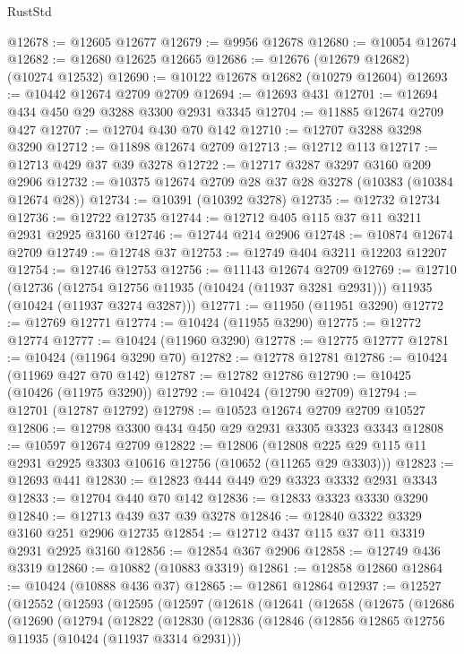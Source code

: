 \begin{lexlean}{RustStd}
\begin{coremodule}
@12678 := @12605 @12677
@12679 := @9956 @12678
@12680 := @10054 @12674
@12682 := @12680 @12625 @12665
@12686 := @12676 (@12679 @12682) (@10274 @12532)
@12690 := @10122 @12678 @12682 (@10279 @12604)
@12693 := @10442 @12674 @2709 @2709
@12694 := @12693 @431
@12701 := @12694 @434 @450 @29 @3288 @3300 @2931 @3345
@12704 := @11885 @12674 @2709 @427
@12707 := @12704 @430 @70 @142
@12710 := @12707 @3288 @3298 @3290
@12712 := @11898 @12674 @2709
@12713 := @12712 @113
@12717 := @12713 @429 @37 @39 @3278
@12722 := @12717 @3287 @3297 @3160 @209 @2906
@12732 := @10375 @12674 @2709 @28 @37 @28 @3278 (@10383 (@10384 @12674 @28))
@12734 := @10391 (@10392 @3278)
@12735 := @12732 @12734
@12736 := @12722 @12735
@12744 := @12712 @405 @115 @37 @11 @3211 @2931 @2925 @3160
@12746 := @12744 @214 @2906
@12748 := @10874 @12674 @2709
@12749 := @12748 @37
@12753 := @12749 @404 @3211 @12203 @12207
@12754 := @12746 @12753
@12756 := @11143 @12674 @2709
@12769 := @12710
    (@12736
      (@12754 @12756 @11935 (@10424 (@11937 @3281 @2931)))
      @11935
      (@10424 (@11937 @3274 @3287)))
@12771 := @11950 (@11951 @3290)
@12772 := @12769 @12771
@12774 := @10424 (@11955 @3290)
@12775 := @12772 @12774
@12777 := @10424 (@11960 @3290)
@12778 := @12775 @12777
@12781 := @10424 (@11964 @3290 @70)
@12782 := @12778 @12781
@12786 := @10424 (@11969 @427 @70 @142)
@12787 := @12782 @12786
@12790 := @10425 (@10426 (@11975 @3290))
@12792 := @10424 (@12790 @2709)
@12794 := @12701 (@12787 @12792)
@12798 := @10523 @12674 @2709 @2709 @10527
@12806 := @12798 @3300 @434 @450 @29 @2931 @3305 @3323 @3343
@12808 := @10597 @12674 @2709
@12822 := @12806
    (@12808 @225 @29 @115 @11 @2931 @2925 @3303 @10616 @12756 (@10652 (@11265 @29 @3303)))
@12823 := @12693 @441
@12830 := @12823 @444 @449 @29 @3323 @3332 @2931 @3343
@12833 := @12704 @440 @70 @142
@12836 := @12833 @3323 @3330 @3290
@12840 := @12713 @439 @37 @39 @3278
@12846 := @12840 @3322 @3329 @3160 @251 @2906 @12735
@12854 := @12712 @437 @115 @37 @11 @3319 @2931 @2925 @3160
@12856 := @12854 @367 @2906
@12858 := @12749 @436 @3319
@12860 := @10882 (@10883 @3319)
@12861 := @12858 @12860
@12864 := @10424 (@10888 @436 @37)
@12865 := @12861 @12864
@12937 := @12527
    (@12552
      (@12593
        (@12595
          (@12597
            (@12618
              (@12641
                (@12658
                  (@12675
                    (@12686
                      (@12690
                        (@12794
                          (@12822
                            (@12830
                              (@12836
                                (@12846
                                  (@12856 @12865 @12756 @11935 (@10424 (@11937 @3314 @2931)))

\end{coremodule}
\end{lexlean}
